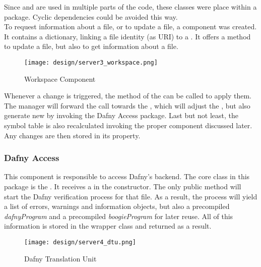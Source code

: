Since  and  are used in multiple parts of the code, these classes were place within a  package.
Cyclic dependencies could be avoided this way.\\

To request information about a file, or to update a file, a component  was created.
It contains a dictionary, linking a file identity (as URI) to a .
It offers a method to update a file, but also to get information about a file.\\

\begin{figure}[ht]
    \centering
    \texttt{[image: design/server3\_workspace.png]}
    \caption{Workspace Component}
    \label{fig:server_workspace}
\end{figure}

Whenever a change is triggered, the  method of the  can be called to apply them.
The manager will forward the call towards the , which will adjust the ,
but also generate new  by invoking the Dafny Access package.
Last but not least, the symbol table is also recalculated invoking the proper component discussed later.
Any changes are then stored in its  property.\\

\subsubsection{Dafny Access}
This component is responsible to access Dafny's backend.
The core class in this package is the \linebreak {}.
It receives a  in the constructor.
The only public method  will start the Dafny verification process for that file.
As a result, the process will yield a list of errors, warnings and information objects, but also a precompiled \textit{dafnyProgram} and a precompiled \textit{boogieProgram} for later reuse.
All of this information is stored in the  wrapper class and returned as a result.\\

\begin{figure}[H]
    \centering
    \texttt{[image: design/server4\_dtu.png]}
    \caption{Dafny Translation Unit}
    \label{fig:server_dtu}
\end{figure}


